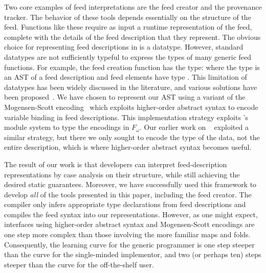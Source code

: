 Two core examples of feed interpretations are the feed creator and the
provenance tracker. The behavior of these tools depends
essentially on the structure of the feed.  Functions like these
require as input a runtime representation of the feed,
complete with the details of the feed description that
they represent. The obvious choice for representing feed descriptions
in \ocaml is a datatype. However, standard \ocaml datatypes are not
sufficiently typeful to express the types of many generic feed
functions. For example, the feed creation function has the type:
 
where the type  is an AST of a feed description and feed 
elements have type .
%
%
This limitation of datatypes has been widely discussed in the
literature, and various solutions have been 
proposed~\cite{padsml-padl,weirich:encodingtypecase,xi:popl03,yang:icfp98}. We have 
chosen to represent our AST using a variant of the Mogensen-Scott
encoding~\cite{mogensen:jfp,wand98} which exploits higher-order abstract syntax 
to encode variable binding in feed descriptions.  This implementation strategy 
exploits \ocaml's module system to type the encodings in $F_\omega$. 
Our earlier work on \padsml~\cite{padsml-padl} 
exploited a similar strategy,
but there we only sought to encode the \ocaml{} type of the data, not
the entire \padsml{} description, which is where higher-order abstract
syntax becomes useful.


The result of our work is that developers
can interpret feed-description representations by case analysis on
their structure, while still achieving the desired static
guarantees. Moreover, we have successfully used this framework to
develop {\it all} of the tools presented in this paper, including the
feed creator. The compiler only infers appropriate
type declarations from feed descriptions and compiles the feed syntax
into our representations.  However, as one might expect, interfaces using
higher-order abstract syntax and Mogensen-Scott encodings are one step more
complex than those involving the more familiar maps and folds.  Consequently, the
learning curve for the generic programmer is one step steeper than
the curve for the single-minded implementor, and two (or perhaps ten) steps steeper
than the curve for the off-the-shelf user.


